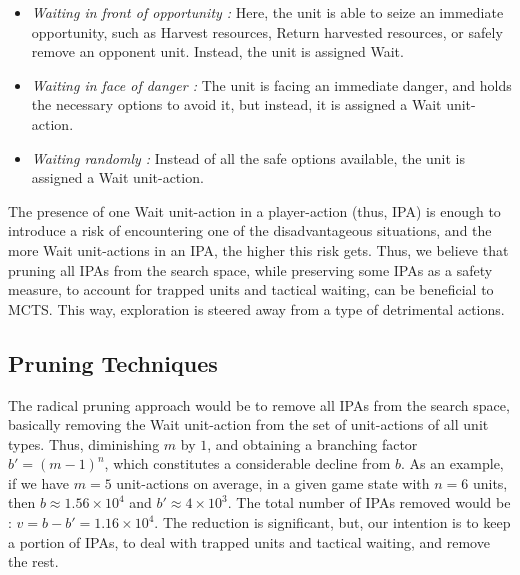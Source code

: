 \documentclass[conference]{IEEEtran}
\begin{document}
\begin{itemize}
\item \textit{Waiting in front of opportunity :} Here, the unit is able to seize an immediate opportunity, such as Harvest resources, Return harvested resources, or safely remove an opponent unit. Instead, the unit is assigned Wait.
\item \textit{Waiting in face of danger :} The unit is facing an immediate danger, and holds the necessary options to avoid it, but instead, it is assigned a Wait unit-action.
\item \textit{Waiting randomly :} Instead of all the safe options available, the unit is assigned a Wait unit-action.
\end{itemize}

The presence of one Wait unit-action in a player-action (thus, IPA) is enough to introduce a risk of encountering one of the disadvantageous situations, and the more Wait unit-actions in an IPA, the higher this risk gets. Thus, we believe that pruning all IPAs from the search space, while preserving some IPAs as a safety measure, to account for trapped units and tactical waiting, can be beneficial to MCTS. This way, exploration is steered away from a type of detrimental actions.



\subsection{Pruning Techniques}

The radical pruning approach would be to remove all IPAs from the search space, basically removing the Wait unit-action from the set of unit-actions of all unit types. Thus, diminishing $m$ by $1$, and obtaining a branching factor $b' = (m - 1)^n$, which constitutes a considerable decline from $b$. As an example, if we have $m=5$ unit-actions on average, in a given game state with $n=6$ units, then $b \approx 1.56\times10^4$ and $b' \approx 4\times10^3$. The total number of IPAs removed would be : $v = b - b' = 1.16\times10^4$. The reduction is significant, but, our intention is to keep a portion of IPAs, to deal with trapped units and tactical waiting, and remove the rest.
\end{document}
